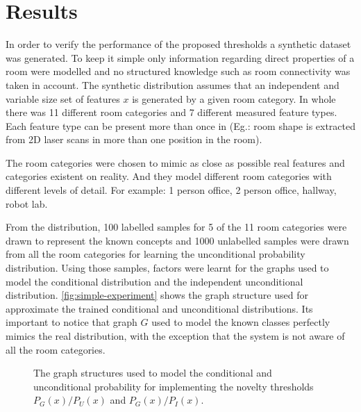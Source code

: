 \documentclass[runningheads,a4paper]{llncs}
\begin{document}
\section{Results}
In order to verify the performance of the proposed thresholds a synthetic dataset
was generated. To keep it simple only information regarding direct properties of
a room were modelled and no structured knowledge such as room connectivity was taken
in account.
The synthetic distribution assumes that an independent and variable size set of features
$x$ is generated by a given room category.
In whole there was 11 different room categories and 7 different measured feature
types. Each feature type can be present more than once in (Eg.: room shape is
extracted from 2D laser scans in more than one position in the room).

The room categories were chosen to mimic as close as possible real features and
categories existent on reality. And they model different room categories with
different levels of detail. For example: 1 person office, 2 person office, hallway,
robot lab.

From the distribution, 100 labelled samples for 5 of the 11 room categories were
drawn to represent the known concepts and 1000 unlabelled samples were drawn from
all the room categories for learning the unconditional probability distribution.
Using those samples, factors were learnt for the graphs used to model the
conditional distribution and the independent unconditional distribution.
\autoref{fig:simple-experiment} shows the graph structure used for approximate the
trained conditional and unconditional distributions.
Its important to notice that graph $G$ used to model the known classes perfectly
mimics the real distribution, with the exception that the system is not aware of
all the room categories.

\begin{figure}[h]
\centering

\qquad
{}
\qquad
{}

\caption{\label{fig:simple-experiment}The graph structures used to model the
         conditional and unconditional probability for implementing the novelty
         thresholds $P_G(x)/P_U(x)$ and $P_G(x)/P_I(x)$.}
\end{figure}
\end{document}

